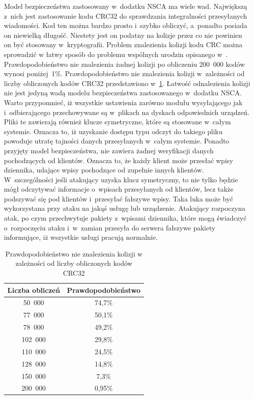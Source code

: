 Model bezpieczeństwa zastosowany w~dodatku NSCA ma wiele
wad. Największą z~nich jest zastosowanie kodu CRC32 do sprawdzania
integralności przesyłanych wiadomości. Kod ten można bardzo prosto
i~szybko obliczyć, a~ponadto posiada on niewielką długość. Niestety
jest on podatny na kolizje przez co nie powinien on być stosowany
w~kryptografii. Problem znalezienia kolizji kodu CRC można sprowadzić
w łatwy sposób do problemu wspólnych urodzin opisanego
w~\cite{www:birthdayParadoks}. Prawdopodobieństwo nie znalezienia
żadnej kolizji po obliczeniu 200~000 kodów wynosi
poniżej~1\%. Prawdopodobieństwo nie znalezienia kolizji w~zależności
od liczby obliczonych kodów CRC32 przedstawiono
w~\ref{tab:CRC32Colisions}. Łatwość odnalezienia kolizji nie jest
jedyną wadą modelu bezpieczeństwa zastosowanego w~dodatku NSCA. Warto
przypomnieć, iż wszystkie ustawienia zarówno modułu wysyłającego jak
i~odbierającego przechowywane są w~plikach na dyskach odpowiednich
urządzeń. Pliki te zawierają również klucze symetryczne, które są
stosowane w~całym systemie. Oznacza to, iż uzyskanie dostępu typu
odczyt do takiego pliku powoduje utratę tajności danych przesyłanych
w~całym systemie. Ponadto przyjęty model bezpieczeństwa, nie zawiera
żadnej weryfikacji danych pochodzących od klientów. Oznacza to, że
każdy klient może przesłać wpisy dziennika, udające wpisy pochodzące
od zupełnie innych klientów. W~szczególności jeśli atakujący uzyska
klucz symetryczny, to nie tylko będzie mógł odczytywać informacje
o~wpisach przesyłanych od klientów, lecz także podszywać się pod
klientów i~przesyłać fałszywe wpisy. Taka luka może być wykorzystana
przy ataku na jakąś usługę lub urządzenie. Atakujący rozpoczyna atak,
po czym przechwytuje pakiety z~wpisami dziennika, które mogą świadczyć
o~rozpoczęciu ataku i~w~zamian przesyła do serwera fałszywe pakiety
informujące, iż wszystkie usługi pracują normalnie.

\begin{table}
\centering
\caption{Prawdopodobieństwo nie znalezienia kolizji w zależności od
  liczby obliczonych kodów CRC32}
\label{tab:CRC32Colisions}
\begin{tabular}{|c|c|}
\hline
Liczba obliczeń & Prawdopodobieństwo \\
\hline
50~000 & 74,7\% \\
\hline
77~000 & 50,1\% \\
\hline
78~000 & 49,2\% \\
\hline
102~000 & 29,8\% \\
\hline
110~000 & 24,5\% \\
\hline
128~000 & 14,8\% \\
\hline
150~000 & 7,3\% \\
\hline
200~000 & 0,95\% \\
\hline
\end{tabular}
\end{table} 

